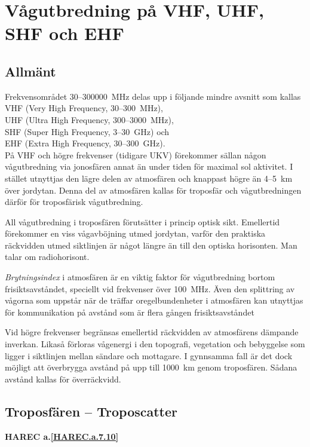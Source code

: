\section[Vågutbredning på VHF-EHF]{Vågutbredning på VHF, UHF, SHF och EHF}

\subsection{Allmänt}
Frekvensområdet 30--300000~MHz delas upp
i följande mindre avsnitt som kallas \\
VHF (Very High Frequency, 30--300~MHz), \\
UHF (Ultra High Frequency, 300--3000~MHz), \\
SHF (Super High Frequency, 3--30~GHz) och \\
EHF (Extra High Frequency, 30--300~GHz). \\

På VHF och högre frekvenser (tidigare UKV) förekommer sällan någon
vågutbredning via jonosfären annat än under tiden för maximal sol
aktivitet. I stället utnyttjas den lägre delen av atmosfären och
knappast högre än 4--5~km över jordytan. Denna del av atmosfären
kallas för troposfär och vågutbredningen därför för troposfärisk
vågutbredning.

All vågutbredning i troposfären förutsätter i princip optisk
sikt. Emellertid förekommer en viss vågavböjning utmed jordytan,
varför den praktiska räckvidden utmed siktlinjen är något längre än
till den optiska horisonten. Man talar om radiohorisont.

\emph{Brytningsindex} i atmosfären är en viktig faktor för
vågutbredning bortom frisiktsavståndet, speciellt vid frekvenser över
100~MHz. Även den splittring av vågorna som uppstår när de träffar
oregelbundenheter i atmosfären kan utnyttjas för kommunikation på
avstånd som är flera gången frisiktsavståndet

Vid högre frekvenser begränsas emellertid räckvidden av atmosfärens
dämpande inverkan. Likaså förloras vågenergi i den topografi,
vegetation och bebyggelse som ligger i siktlinjen mellan sändare och
mottagare. I gynnsamma fall är det dock möjligt att överbrygga avstånd
på upp till 1000~km genom troposfären. Sådana avstånd kallas för
överräckvidd.

\subsection{Troposfären -- Troposcatter}
\textbf{
HAREC a.\ref{HAREC.a.7.10}\label{myHAREC.a.7.10}
}

